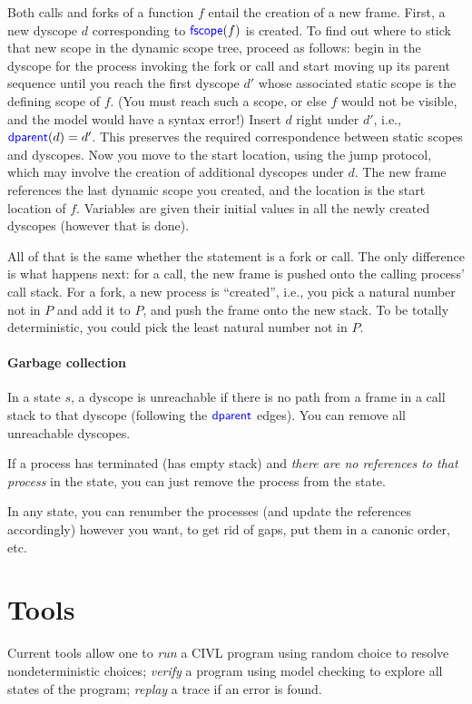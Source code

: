 \documentclass[11pt]{book}
\begin{document}
Both calls and forks of a function $f$ entail the creation of a new
frame. First, a new dyscope $d$ corresponding to $\textsf{\textcolor{blue}{\textup{fscope}}}(f)$ is
created. To find out where to stick that new scope in the dynamic
scope tree, proceed as follows: begin in the dyscope for the
process invoking the fork or call and start moving up its parent
sequence until you reach the first dyscope $d'$ whose associated
static scope is the defining scope of $f$. (You must reach such a
scope, or else $f$ would not be visible, and the model would have a
syntax error!) Insert $d$ right under $d'$, i.e.,
$\textsf{\textcolor{blue}{\textup{dparent}}}(d)=d'$. This preserves the required correspondence between
static scopes and dyscopes. Now you move to the start location,
using the jump protocol, which may involve the creation of additional
dyscopes under $d$. The new frame references the last dynamic
scope you created, and the location is the start location of $f$.
Variables are given their initial values in all the newly created
dyscopes (however that is done).

All of that is the same whether the statement is a fork or call. The
only difference is what happens next: for a call, the new frame is
pushed onto the calling process' call stack. For a fork, a new process
is ``created'', i.e., you pick a natural number not in $P$ and
add it to $P$, and push the frame onto the new stack.   To be totally
deterministic, you could pick the least natural number not in $P$.

\subsection{Garbage collection}

In a state $s$, a dyscope is unreachable if there is no path
from a frame in a call stack to that dyscope (following the
$\textsf{\textcolor{blue}{\textup{dparent}}}$ edges).  You can remove all unreachable dyscopes.

If a process has terminated (has empty stack) and \emph{there are no
references to that process} in the state, you can just remove the process
from the state.

In any state, you can renumber the processes (and update the
references accordingly) however you want, to get rid of gaps, put them
in a canonic order, etc.


\part{Tools}

Current tools allow one to \emph{run} a CIVL program using random
choice to resolve nondeterministic choices; \emph{verify} a program
using model checking to explore all states of the program;
\emph{replay} a trace if an error is found.
\end{document}
